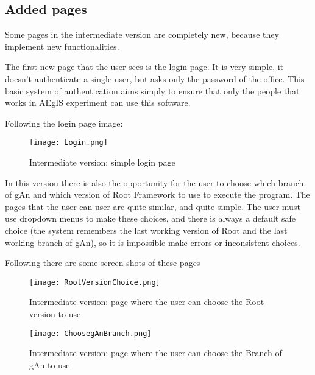 \subsection{Added pages}

Some pages in the intermediate version are completely new, because they implement new functionalities.

The first new page that the user sees is the login page. It is very simple, it doesn't authenticate a single user, but asks only the password of the office. This basic system of authentication aims simply to ensure that only the people that works in AEgIS experiment can use this software.

Following the login page image:

\begin{figure}[H]
\centering
\texttt{[image: Login.png]} 
\caption{Intermediate version: simple login page}
\end{figure}

In this version there is also the opportunity for the user to choose which branch of gAn and which version of Root Framework to use to execute the program. The pages that the user can user are quite similar, and quite simple. The user must use dropdown menus to make these choices, and there is always a default safe choice (the system remembers the last working version of Root and the last working branch of gAn), so it is impossible make errors or inconsistent choices. 

Following there are some screen-shots of these pages

\begin{figure}[H]
\centering
\texttt{[image: RootVersionChoice.png]} 
\caption{Intermediate version: page where the user can choose the Root version to use}
\end{figure}
 
 
\begin{figure}[H]
\centering
\texttt{[image: ChoosegAnBranch.png]} 
\caption{Intermediate version: page where the user can choose the Branch of gAn to use}
\end{figure}

